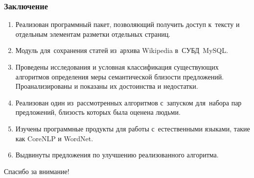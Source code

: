 \documentclass{beamer}
\begin{document}
\begin{frame}
\frametitle{Заключение}

\begin{enumerate}
\item {
Реализован программный пакет, позволяющий получить доступ к~тексту
и отдельным элементам разметки отдельных страниц.
}
\item {
Модуль для~сохранения статей из~архива Wikipedia
в~СУБД~MySQL.
}
\item {
Проведены исследования и условная классификация существующих 
алгоритмов определения меры семантической близости предложений. 
Проанализированы и показаны их достоинства и недостатки.
}
\item {
Реализован один из~рассмотренных алгоритмов с~запуском для~набора 
пар предложений, близость которых была оценена людьми. 
}
\item {
Изучены программные продукты для работы
с~естественными языками, такие как CoreNLP и WordNet.
} 
\item {
Выдвинуты предложения по улучшению реализованного алгоритма.
}
\end{enumerate}
\end{frame}

\begin{frame}
{\Large Спасибо за внимание!}
\end{frame}
\end{document}
